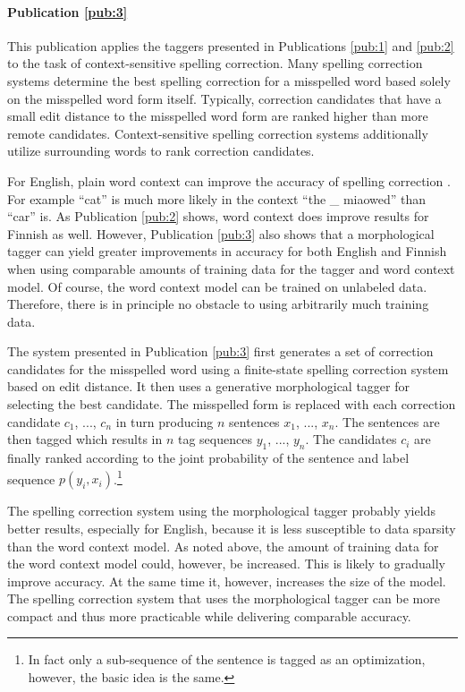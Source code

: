 \paragraph{Publication \ref{pub:3}} This publication applies the
taggers presented in Publications \ref{pub:1} and \ref{pub:2} to the
task of context-sensitive spelling correction. Many spelling
correction systems determine the best spelling correction for a
misspelled word based solely on the misspelled word form
itself. Typically, correction candidates that have a small edit
distance to the misspelled word form are ranked higher than more
remote candidates. Context-sensitive spelling correction systems
additionally utilize surrounding words to rank correction candidates.

For English, plain word context can improve the accuracy of spelling
correction \citep{Brill2000}. For example ``cat'' is much more likely
in the context ``the _ miaowed'' than ``car'' is. As Publication
\ref{pub:2} shows, word context does improve results for Finnish as
well. However, Publication \ref{pub:3} also shows that a morphological
tagger can yield greater improvements in accuracy for both English and
Finnish when using comparable amounts of training data for the tagger
and word context model. Of course, the word context model can be
trained on unlabeled data. Therefore, there is in principle no
obstacle to using arbitrarily much training data.

The system presented in Publication \ref{pub:3} first generates a set
of correction candidates for the misspelled word using a finite-state
spelling correction system based on edit distance. It then uses a
generative morphological tagger for selecting the best candidate. The
misspelled form is replaced with each correction candidate $c_1$, ...,
$c_n$ in turn producing $n$ sentences $x_1$, ..., $x_n$. The sentences
are then tagged which results in $n$ tag sequences $y_1$, ...,
$y_n$. The candidates $c_i$ are finally ranked according to the joint
probability of the sentence and label sequence
$p(y_i,x_i)$.\footnote{In fact only a sub-sequence of the sentence is
  tagged as an optimization, however, the basic idea is the same.}

The spelling correction system using the morphological tagger probably
yields better results, especially for English, because it is less
susceptible to data sparsity than the word context model. As noted
above, the amount of training data for the word context model could,
however, be increased. This is likely to gradually improve
accuracy. At the same time it, however, increases the size of the
model. The spelling correction system that uses the morphological
tagger can be more compact and thus more practicable while delivering
comparable accuracy.
